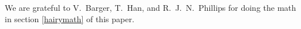 \documentclass[11pt,twoside]{article}  %
\begin{document}

\acknowledgments

We are grateful to V.\ Barger, T.\ Han, and R.~J.~N.\ Phillips for doing
the math in section \ref{hairymath} of this paper.

%
%
%
\end{document}
